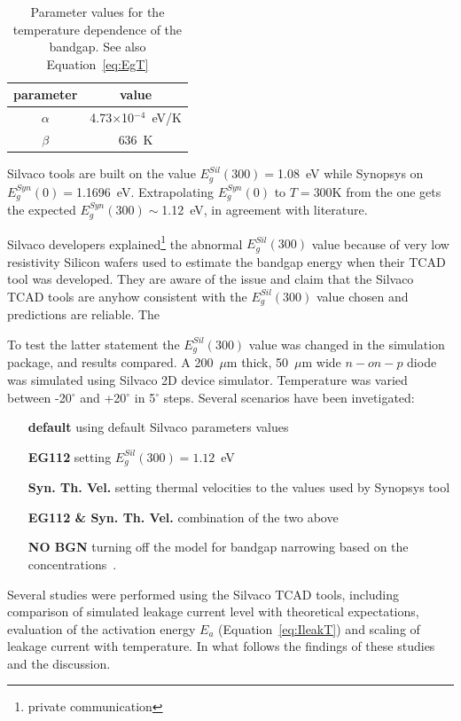 \begin{table}[!htbp]
\caption{\label{eq:Egalphabeta}Parameter values for the temperature dependence of the bandgap. 
See also Equation~\ref{eq:EgT}}
\centering
\begin{tabular}{|c|c|}
\hline
parameter & value \\
\hline 
$\alpha$ & 4.73$\times$10$^{-4}$~eV/K \\
\hline 
$\beta$ & 636~K \\
\hline
\end{tabular}
\end{table}

Silvaco tools are built on the value $E^{Sil}_g(300)=$1.08~eV while Synopsys on $E^{Syn}_g(0)=$1.1696~eV. 
Extrapolating $E_g^{Syn}(0)$ to $T=$300K from the one gets the expected 
$E_g^{Syn}(300)\sim$1.12~eV, in agreement with literature.

Silvaco developers explained\footnote{private communication} the abnormal $E^{Sil}_g(300)$ value 
because of very low resistivity 
Silicon wafers used to estimate the bandgap energy when their TCAD tool was developed. 
They are aware of the issue and claim that the Silvaco TCAD tools are anyhow consistent with 
the $E^{Sil}_g(300)$ value chosen and predictions are reliable. The 

To test the latter statement the $E^{Sil}_g(300)$ value was changed in the simulation package, 
and results compared. 
A 200~$\mu$m thick, 50~$\mu$m wide $n-on-p$ diode was simulated using Silvaco 2D device 
simulator. Temperature was varied between -20$^{\circ}$ and +20$^{\circ}$ in 5$^{\circ}$ steps. 
Several scenarios have been invetigated:

\begin{itemize}
\item[\bf default] using default Silvaco parameters values
\item[\bf EG112] setting $E^{Sil}_g(300)=1.12$~eV
\item[\bf Syn. Th. Vel.] setting thermal velocities to the values used by Synopsys tool
\item[\bf EG112 \& Syn. Th. Vel.] combination of the two above 
\item[\bf NO BGN] turning off the model for bandgap narrowing based on the concentrations~\cite{SLOTBOOM1977279}.
\end{itemize}

Several studies were performed using the Silvaco TCAD tools,
 including comparison of simulated leakage current level with 
theoretical expectations,  evaluation of the activation energy $E_{a}$ (Equation~\ref{eq:IleakT}) 
and scaling of leakage current with temperature. In what follows the findings of these 
studies and the discussion.

